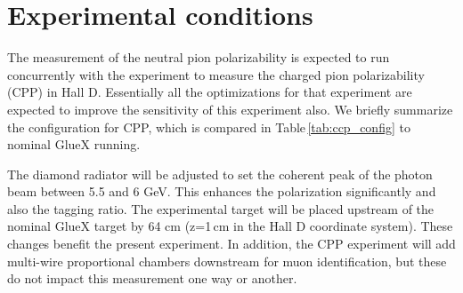 
\section{Experimental conditions}
The measurement of the neutral pion polarizability is expected to run
concurrently with the experiment to measure the charged pion
polarizability (CPP) \cite{CPPexp} in Hall D. Essentially all the
optimizations for that experiment are expected to improve the
sensitivity of this experiment also. We briefly summarize the
configuration for CPP, which is compared in
Table\,\ref{tab:ccp_config} to nominal GlueX running.
 
The diamond radiator will be adjusted to set the coherent peak of the
photon beam between 5.5 and 6 GeV. This enhances the polarization
significantly and also the tagging ratio.  The experimental target
will be placed upstream of the nominal GlueX target by 64 cm (z=1\,cm
in the Hall D coordinate system). These changes benefit the present
experiment. In addition, the CPP experiment will add multi-wire
proportional chambers downstream for muon identification, but these do
not impact this measurement one way or another.
 
